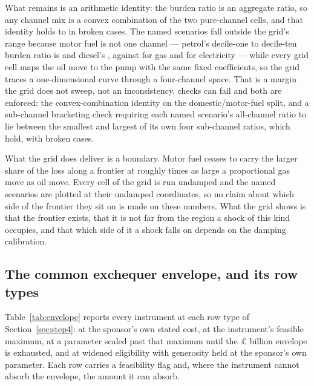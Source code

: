 What remains is an arithmetic identity: the burden ratio is an aggregate ratio, so any channel mix is a convex combination of the two pure-channel cells, and that identity holds to \genGridReconIdentityTolerance{} in \genGridReconIdentityBrokenCount{} broken cases. The named scenarios fall outside the grid's range because motor fuel is not one channel --- petrol's decile-one to decile-ten burden ratio is \genGridSubChannelRatioPetrol{} and diesel's \genGridSubChannelRatioDiesel{}, against \genGridSubChannelRatioGas{} for gas and \genGridSubChannelRatioElec{} for electricity --- while every grid cell maps the oil move to the pump with the same fixed coefficients, so the grid traces a one-dimensional curve through a four-channel space. That is a margin the grid does not sweep, not an inconsistency. \genGridEnforcedCheckCount{} checks can fail and both are enforced: the convex-combination identity on the domestic/motor-fuel split, and a sub-channel bracketing check requiring each named scenario's all-channel ratio to lie between the smallest and largest of its own four sub-channel ratios, which \genGridSubChannelBracketingHolds{} hold, with \genGridSubChannelBracketingBrokenCount{} broken cases.

What the grid does deliver is a boundary. Motor fuel ceases to carry the larger share of the loss along a frontier at roughly \genGridFrontierSlope{} times as large a proportional gas move as oil move. Every cell of the grid is run undamped and the named scenarios are plotted at their undamped coordinates, so no claim about which side of the frontier they sit on is made on these numbers. What the grid shows is that the frontier exists, that it is not far from the region a shock of this kind occupies, and that which side of it a shock falls on depends on the damping calibration.

\subsection{The common exchequer envelope, and its row types}
\label{app:envelope}

Table~\ref{tab:envelope} reports every instrument at each row type of Section~\ref{sec:step4}: at the sponsor's own stated cost, at the instrument's feasible maximum, at a parameter scaled past that maximum until the \pounds \genEnvelopeBn{} billion envelope is exhausted, and at widened eligibility with generosity held at the sponsor's own parameter. Each row carries a feasibility flag and, where the instrument cannot absorb the envelope, the amount it can absorb.

